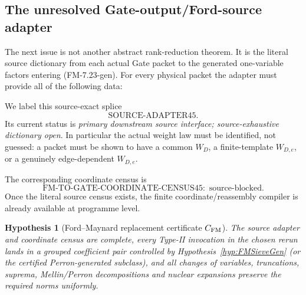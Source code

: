 \documentclass[11pt]{article}
\newtheorem{hypothesis}[theorem]{Hypothesis}
\theoremstyle{definition}
\theoremstyle{remark}
\newcommand{\1}{\mathbf 1}
\begin{document}
\subsection{The unresolved Gate-output/Ford-source adapter}

The next issue is not another abstract rank-reduction theorem.  It is the literal source dictionary from each
actual Gate packet to the generated one-variable factors entering (FM-7.23-gen).  For every physical packet the adapter must provide all of the following data:
\begin{center}
\end{center}
We label this source-exact splice
\[
 \boxed{\mathrm{SOURCE\!\mbox{-}ADAPTER45}.}
\tag{SOURCE-ADAPTER45}
\]
Its current status is \emph{primary downstream source interface; source-exhaustive dictionary open}.  In
particular the actual weight law must be identified, not guessed: a packet must be shown to have a common
$W_D$, a finite-template $W_{D,e}$, or a genuinely edge-dependent $W_{D,e}$.

The corresponding coordinate census is
\[
 \boxed{\mathrm{FM\!\mbox{-}TO\!\mbox{-}GATE\!\mbox{-}COORDINATE\!\mbox{-}CENSUS45}:
 \text{ source-blocked}.}
\tag{FM-Gate-census}
\]
Once the literal source census exists, the finite coordinate/reassembly compiler is already available at
programme level.

\begin{hypothesis}[Ford--Maynard replacement certificate $C_{\rm FM}$]\label{hyp:CFM}
The source adapter and coordinate census are complete, every Type-II invocation in the chosen rerun lands in a
grouped coefficient pair controlled by Hypothesis~\ref{hyp:FMSieveGen} (or the certified Perron-generated
subclass), and all changes of variables, truncations, suprema, Mellin/Perron decompositions and nuclear
expansions preserve the required norms uniformly.
\end{hypothesis}
\end{document}
